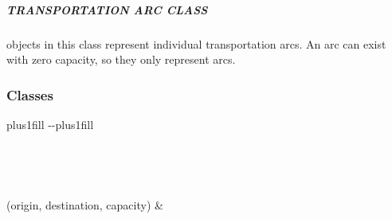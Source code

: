 \documentclass[letterpaper,10pt,english]{sphinxmanual}
\begin{document}
\subparagraph{TRANSPORTATION ARC CLASS}
\label{\detokenize{src.models.hydrogen.network.transportation_arc:transportation-arc-class}}
\sphinxAtStartPar
objects in this class represent individual transportation arcs. An arc can exist with zero capacity,
so they only represent  arcs.
\subsubsection*{Classes}


\begin{savenotes}
\sphinxatlongtablestart
\sphinxthistablewithglobalstyle
\sphinxthistablewithnovlinesstyle
\makeatletter
  \LTleft \@totalleftmargin plus1fill
  \LTright\dimexpr\columnwidth-\@totalleftmargin-\linewidth\relax plus1fill
\makeatother
\begin{longtable}{}
\sphinxtoprule
\endfirsthead

\\
\sphinxtoprule
\endhead

\sphinxbottomrule
{}\\
\endfoot

\endlastfoot
\sphinxtableatstartofbodyhook

\sphinxAtStartPar
{\hyperref[\detokenize{src.models.hydrogen.network.transportation_arc:src.models.hydrogen.network.transportation_arc.TransportationArc}]{}}(origin, destination, capacity)
&
\sphinxAtStartPar

\\
\sphinxbottomrule
\end{longtable}
\sphinxtableafterendhook
\sphinxatlongtableend
\end{savenotes}
\end{document}
